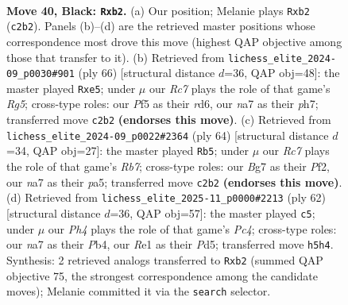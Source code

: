 \documentclass[11pt]{article}
\begin{document}
\clearpage

\begin{figure}[p]\centering
\begin{subfigure}{0.46\textwidth}\centering
\resizebox{\linewidth}{!}{%
\newchessgame
\chessboard[
  setfen={8/Np4bk/6p1/5p1p/P7/R5P1/1Pr2PKP/4r3 b - - 2 40},
  showmover=false,
  pgfstyle=straightmove, color=movearrow, markmove={c2-b2}
]}
\caption{}
\end{subfigure}\hfill
\begin{subfigure}{0.46\textwidth}\centering
\resizebox{\linewidth}{!}{%
\newchessgame
\chessboard[
  setfen={8/Rpk4p/2pr2p1/4p1R1/5r2/2K2P2/1P2P3/8 w - - 0 34},
  showmover=false,
  pgfstyle=straightmove, color=movearrow, markmove={g5-e5}
]}
\caption{}
\end{subfigure}
\\[4pt]
\begin{subfigure}{0.46\textwidth}\centering
\resizebox{\linewidth}{!}{%
\newchessgame
\chessboard[
  setfen={8/1R3pkp/6p1/p2rp3/P6P/6P1/5PK1/8 w - - 0 33},
  showmover=false,
  pgfstyle=straightmove, color=movearrow, markmove={b7-b5}
]}
\caption{}
\end{subfigure}\hfill
\begin{subfigure}{0.46\textwidth}\centering
\resizebox{\linewidth}{!}{%
\newchessgame
\chessboard[
  setfen={3r1nk1/1p3p1p/3p1Rp1/3P4/1PP5/6P1/6BP/6K1 w - - 1 32},
  showmover=false,
  pgfstyle=straightmove, color=movearrow, markmove={c4-c5}
]}
\caption{}
\end{subfigure}
\caption{\textbf{Move 40, Black: \texttt{Rxb2}.} (a) Our position; Melanie plays \texttt{Rxb2} (\texttt{c2b2}). Panels (b)--(d) are the retrieved master positions whose correspondence most drove this move (highest QAP objective among those that transfer to it). (b) Retrieved from \texttt{lichess\_elite\_2024-09\_p0030\#901} (ply 66) [structural distance $d$=36, QAP obj=48]: the master played \texttt{Rxe5}; under $\mu$ our \emph{Rc7} plays the role of that game's \emph{Rg5}; cross-type roles: our \emph{P}f5 as their \emph{r}d6, our \emph{n}a7 as their \emph{p}h7; transferred move \texttt{c2b2} \textbf{(endorses this move)}. (c) Retrieved from \texttt{lichess\_elite\_2024-09\_p0022\#2364} (ply 64) [structural distance $d$=34, QAP obj=27]: the master played \texttt{Rb5}; under $\mu$ our \emph{Rc7} plays the role of that game's \emph{Rb7}; cross-type roles: our \emph{B}g7 as their \emph{P}f2, our \emph{n}a7 as their \emph{p}a5; transferred move \texttt{c2b2} \textbf{(endorses this move)}. (d) Retrieved from \texttt{lichess\_elite\_2025-11\_p0000\#2213} (ply 62) [structural distance $d$=36, QAP obj=57]: the master played \texttt{c5}; under $\mu$ our \emph{Ph4} plays the role of that game's \emph{Pc4}; cross-type roles: our \emph{n}a7 as their \emph{P}b4, our \emph{R}e1 as their \emph{P}d5; transferred move \texttt{h5h4}. Synthesis: 2 retrieved analogs transferred to \texttt{Rxb2} (summed QAP objective 75, the strongest correspondence among the candidate moves); Melanie committed it via the \texttt{search} selector.}
\label{fig:thought-m79}
\end{figure}
\end{document}
